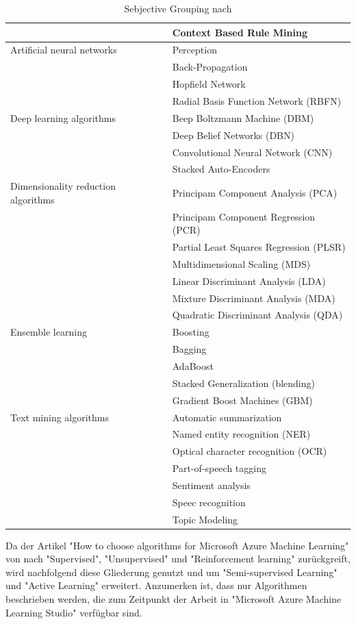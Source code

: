 \begin{table}[H]
\begin{tabular}{|l|l|}
& Context Based Rule Mining\\
\hline
Artificial neural networks & Perception\\
& Back-Propagation\\
& Hopfield Network\\
& Radial Basis Function Network (RBFN)\\
\hline
Deep learning algorithms & Beep Boltzmann Machine (DBM)\\
& Deep Belief Networks (DBN)\\
& Convolutional Neural Network (CNN)\\
& Stacked Auto-Encoders\\
\hline
Dimensionality reduction algorithms & Principam Component Analysis (PCA)\\
& Principam Component Regression (PCR)\\
& Partial Least Squares Regression (PLSR)\\
& Multidimensional Scaling (MDS)\\
& Linear Discriminant Analysis (LDA)\\
& Mixture Discriminant Analysis (MDA)\\
& Quadratic Discriminant Analysis (QDA)\\
\hline
Ensemble learning & Boosting\\
& Bagging\\
& AdaBoost\\
& Stacked Generalization (blending)\\
& Gradient Boost Machines (GBM)\\
\hline
Text mining algorithms & Automatic summarization\\
& Named entity recognition (NER)\\
& Optical character recognition (OCR)\\
& Part-of-speech tagging\\
& Sentiment analysis\\
& Speec recognition\\
& Topic Modeling\\
   \hline
\end{tabular}
\caption{Sebjective Grouping nach \citep[S.~224-229]{ramasubramanian_machine_2017}}
\label{tab:SebjectiveGrouping}
\end{table}

Da der Artikel "How to choose algorithms for Microsoft Azure Machine Learning" von \citep{ericson_microsoft_2017} nach "Supervised", "Unsupervised" und "Reinforcement learning" zurückgreift, wird nachfolgend diese Gliederung genutzt und um "Semi-supervised Learning" und "Active Learning" erweitert. \newline
{} Anzumerken ist, dass nur Algorithmen beschrieben werden, die zum Zeitpunkt der Arbeit in "Microsoft Azure Machine Learning Studio" verfügbar sind.

